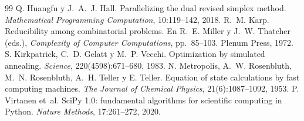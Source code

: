 \begin{thebibliography}{99}
 Q. Huangfu y J.~A.~J. Hall. Parallelizing the dual revised simplex method. \emph{Mathematical Programming Computation}, 10:119--142, 2018.
 R.~M. Karp. Reducibility among combinatorial problems. En R.~E. Miller y J.~W. Thatcher (eds.), \emph{Complexity of Computer Computations}, pp.\ 85--103. Plenum Press, 1972.
 S. Kirkpatrick, C.~D. Gelatt y M.~P. Vecchi. Optimization by simulated annealing. \emph{Science}, 220(4598):671--680, 1983.
 N. Metropolis, A.~W. Rosenbluth, M.~N. Rosenbluth, A.~H. Teller y E. Teller. Equation of state calculations by fast computing machines. \emph{The Journal of Chemical Physics}, 21(6):1087--1092, 1953.
 P. Virtanen et~al. SciPy 1.0: fundamental algorithms for scientific computing in Python. \emph{Nature Methods}, 17:261--272, 2020.
\end{thebibliography}
